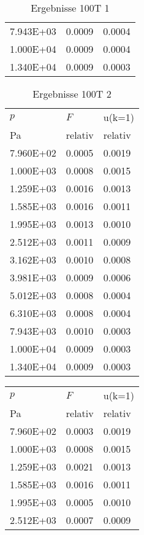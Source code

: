 \begin{table}
\begin{tabular}{l l l }
\num{7.943E+03}&\num{0.0009}&\num{0.0004}\\
\num{1.000E+04}&\num{0.0009}&\num{0.0004}\\
\num{1.340E+04}&\num{0.0009}&\num{0.0003}\\
\bottomrule
\end{tabular}\caption{Ergebnisse 100T 1}\end{table}\begin{table}\begin{tabular}{l l l }
\toprule
$p$&$F$&u(k=1)\\
 Pa & relativ & relativ\\\midrule
\num{7.960E+02}&\num{0.0005}&\num{0.0019}\\
\num{1.000E+03}&\num{0.0008}&\num{0.0015}\\
\num{1.259E+03}&\num{0.0016}&\num{0.0013}\\
\num{1.585E+03}&\num{0.0016}&\num{0.0011}\\
\num{1.995E+03}&\num{0.0013}&\num{0.0010}\\
\num{2.512E+03}&\num{0.0011}&\num{0.0009}\\
\num{3.162E+03}&\num{0.0010}&\num{0.0008}\\
\num{3.981E+03}&\num{0.0009}&\num{0.0006}\\
\num{5.012E+03}&\num{0.0008}&\num{0.0004}\\
\num{6.310E+03}&\num{0.0008}&\num{0.0004}\\
\num{7.943E+03}&\num{0.0010}&\num{0.0003}\\
\num{1.000E+04}&\num{0.0009}&\num{0.0003}\\
\num{1.340E+04}&\num{0.0009}&\num{0.0003}\\
\bottomrule
\end{tabular}\caption{Ergebnisse 100T 2}\end{table}\begin{table}\begin{tabular}{l l l }
\toprule
$p$&$F$&u(k=1)\\
 Pa & relativ & relativ\\\midrule
\num{7.960E+02}&\num{0.0003}&\num{0.0019}\\
\num{1.000E+03}&\num{0.0008}&\num{0.0015}\\
\num{1.259E+03}&\num{0.0021}&\num{0.0013}\\
\num{1.585E+03}&\num{0.0016}&\num{0.0011}\\
\num{1.995E+03}&\num{0.0005}&\num{0.0010}\\
\num{2.512E+03}&\num{0.0007}&\num{0.0009}\\

\end{tabular}
\end{table}
